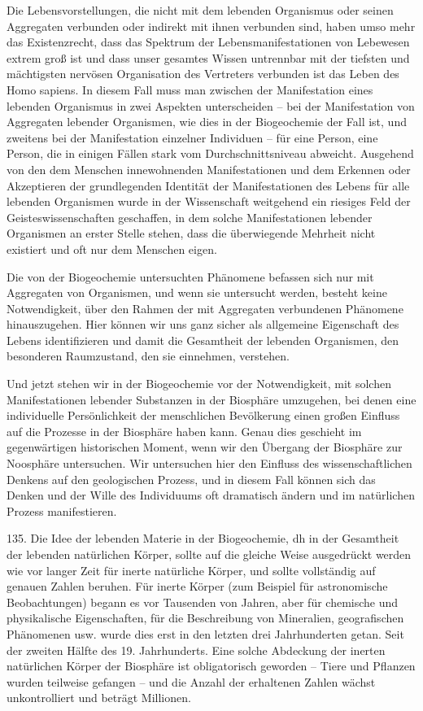 \documentclass[11pt,a4paper]{book}
\begin{document}
Die Lebensvorstellungen, die nicht mit dem lebenden Organismus oder seinen Aggregaten verbunden oder indirekt mit ihnen verbunden sind, haben umso mehr das Existenzrecht, dass das Spektrum der Lebensmanifestationen von Lebewesen extrem groß ist und dass unser gesamtes Wissen untrennbar mit der tiefsten und mächtigsten nervösen Organisation des Vertreters verbunden ist das Leben des Homo sapiens. In diesem Fall muss man zwischen der Manifestation eines lebenden Organismus in zwei Aspekten unterscheiden -- bei der Manifestation von Aggregaten lebender Organismen, wie dies in der Biogeochemie der Fall ist, und zweitens bei der Manifestation einzelner Individuen -- für eine Person, eine Person, die in einigen Fällen stark vom Durchschnittsniveau abweicht. Ausgehend von den dem Menschen innewohnenden Manifestationen und dem Erkennen oder Akzeptieren der grundlegenden Identität der Manifestationen des Lebens für alle lebenden Organismen wurde in der Wissenschaft weitgehend ein riesiges Feld der Geisteswissenschaften geschaffen, in dem solche Manifestationen lebender Organismen an erster Stelle stehen, dass die überwiegende Mehrheit nicht existiert und oft nur dem Menschen eigen.



Die von der Biogeochemie untersuchten Phänomene befassen sich nur mit Aggregaten von Organismen, und wenn sie untersucht werden, besteht keine Notwendigkeit, über den Rahmen der mit Aggregaten verbundenen Phänomene hinauszugehen. Hier können wir uns ganz sicher als allgemeine Eigenschaft des Lebens identifizieren und damit die Gesamtheit der lebenden Organismen, den besonderen Raumzustand, den sie einnehmen, verstehen.



Und jetzt stehen wir in der Biogeochemie vor der Notwendigkeit, mit solchen Manifestationen lebender Substanzen in der Biosphäre umzugehen, bei denen eine individuelle Persönlichkeit der menschlichen Bevölkerung einen großen Einfluss auf die Prozesse in der Biosphäre haben kann. Genau dies geschieht im gegenwärtigen historischen Moment, wenn wir den Übergang der Biosphäre zur Noosphäre untersuchen. Wir untersuchen hier den Einfluss des wissenschaftlichen Denkens auf den geologischen Prozess, und in diesem Fall können sich das Denken und der Wille des Individuums oft dramatisch ändern und im natürlichen Prozess manifestieren.



135. Die Idee der lebenden Materie in der Biogeochemie, dh in der Gesamtheit der lebenden natürlichen Körper, sollte auf die gleiche Weise ausgedrückt werden wie vor langer Zeit für inerte natürliche Körper, und sollte vollständig auf genauen Zahlen beruhen. Für inerte Körper (zum Beispiel für astronomische Beobachtungen) begann es vor Tausenden von Jahren, aber für chemische und physikalische Eigenschaften, für die Beschreibung von Mineralien, geografischen Phänomenen usw. wurde dies erst in den letzten drei Jahrhunderten getan. Seit der zweiten Hälfte des 19. Jahrhunderts. Eine solche Abdeckung der inerten natürlichen Körper der Biosphäre ist obligatorisch geworden -- Tiere und Pflanzen wurden teilweise gefangen -- und die Anzahl der erhaltenen Zahlen wächst unkontrolliert und beträgt Millionen.
\end{document}
